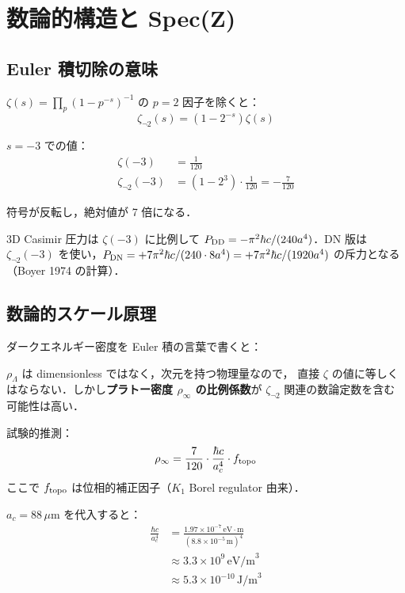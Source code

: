 \documentclass[11pt,a4paper]{article}
\begin{document}
\section{数論的構造と Spec(Z)}

\subsection{Euler 積切除の意味}

$\zeta(s) = \prod_p (1 - p^{-s})^{-1}$ の $p=2$ 因子を除くと：
\begin{equation}
\zeta_{\neg 2}(s) = (1 - 2^{-s})\zeta(s)
\end{equation}

$s = -3$ での値：
\begin{align}
\zeta(-3) &= \frac{1}{120} \\
\zeta_{\neg 2}(-3) &= (1 - 2^3)\cdot\frac{1}{120} = -\frac{7}{120}
\end{align}

符号が反転し，絶対値が 7 倍になる．

3D Casimir 圧力は $\zeta(-3)$ に比例して $P_{\rm DD} = -\pi^2\hbar c/(240
a^4)$．DN 版は $\zeta_{\neg 2}(-3)$ を使い，$P_{\rm DN} = +7\pi^2\hbar c/
(240 \cdot 8 a^4) = +7\pi^2\hbar c/(1920 a^4)$ の斥力となる
（Boyer 1974 の計算）．

\subsection{数論的スケール原理}

ダークエネルギー密度を Euler 積の言葉で書くと：

$\rho_\Lambda$ は dimensionless ではなく，次元を持つ物理量なので，
直接 $\zeta$ の値に等しくはならない．しかし\textbf{プラトー密度
$\rho_\infty$ の比例係数}が $\zeta_{\neg 2}$ 関連の数論定数を含む
可能性は高い．

試験的推測：
\begin{equation}
\rho_\infty = \frac{7}{120} \cdot \frac{\hbar c}{a_c^4} \cdot f_{\rm topo}
\end{equation}
ここで $f_{\rm topo}$ は位相的補正因子（$K_1$ Borel regulator 由来）．

$a_c = 88\,\mu$m を代入すると：
\begin{align}
\frac{\hbar c}{a_c^4} &= \frac{1.97\times 10^{-7}\,\text{eV}\cdot\text{m}}
{(8.8\times 10^{-5}\,\text{m})^4} \\
&\approx 3.3\times 10^{9}\,\text{eV/m}^3 \\
&\approx 5.3\times 10^{-10}\,\text{J/m}^3
\end{align}
\end{document}
